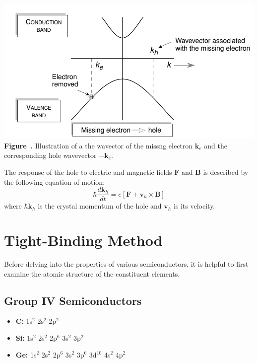 \begin{center}
	\begin{minipage}{0.7\textwidth}
		\centering
		\includegraphics[width=\textwidth]{img/missingelectron.png}
		\\[0.5em]
		\textbf{Figure~\thefigure.} Illustration of a the wavector of the missng electron $\mathbf{k}_e$ and the corresponding hole wavevector $-\mathbf{k}_e$.
		\label{fig:missingelectron}
	\end{minipage}
\end{center}

The response of the hole to electric and magnetic fields \( \mathbf{F} \) and \( \mathbf{B} \) is described by the following equation of motion:
\begin{equation*}
	\hbar \frac{d\mathbf{k}_h}{dt} = e\left[\mathbf{F} + \mathbf{v}_h \times \mathbf{B} \right]
\end{equation*}
\noindent
where \( \hbar \mathbf{k}_h \) is the crystal momentum of the hole and \( \mathbf{v}_h \) is its velocity.

\section{Tight-Binding Method}
Before delving into the properties of various semiconductors, it is helpful to first examine the atomic structure of the constituent elements.

\subsection*{Group IV Semiconductors}

\begin{itemize}
	\item \textbf{C:} \quad 1s$^2$ 2s$^2$ 2p$^2$
	\item \textbf{Si:} \quad 1s$^2$ 2s$^2$ 2p$^6$ 3s$^2$ 3p$^2$
	\item \textbf{Ge:} \quad 1s$^2$ 2s$^2$ 2p$^6$ 3s$^2$ 3p$^6$ 3d$^{10}$ 4s$^2$ 4p$^2$
\end{itemize}

